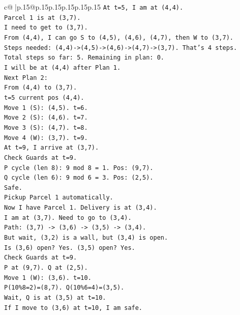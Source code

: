 \documentclass{article}
\begin{document}
{\begin{supertabular}{c@{$\;$}|p{.15\linewidth}@{}p{.15\linewidth}p{.15\linewidth}p{.15\linewidth}p{.15\linewidth}p{.15\linewidth}}
{{{\texttt{At t=5, I am at (4,4).} \\
\texttt{Parcel 1 is at (3,7).} \\
\texttt{I need to get to (3,7).} \\
\texttt{From (4,4), I can go S to (4,5), (4,6), (4,7), then W to (3,7).} \\
\texttt{Steps needed: (4,4){-}>(4,5){-}>(4,6){-}>(4,7){-}>(3,7). That's 4 steps.} \\
\texttt{Total steps so far: 5. Remaining in plan: 0.} \\
\texttt{I will be at (4,4) after Plan 1.} \\
\texttt{Next Plan 2:} \\
\texttt{From (4,4) to (3,7).} \\
\texttt{t=5 current pos (4,4).} \\
\texttt{Move 1 (S): (4,5). t=6.} \\
\texttt{Move 2 (S): (4,6). t=7.} \\
\texttt{Move 3 (S): (4,7). t=8.} \\
\texttt{Move 4 (W): (3,7). t=9.} \\
\texttt{At t=9, I arrive at (3,7).} \\
\texttt{Check Guards at t=9.} \\
\texttt{P cycle (len 8): 9 mod 8 = 1. Pos: (9,7).} \\
\texttt{Q cycle (len 6): 9 mod 6 = 3. Pos: (2,5).} \\
\texttt{Safe.} \\
\texttt{Pickup Parcel 1 automatically.} \\
\texttt{Now I have Parcel 1. Delivery is at (3,4).} \\
\texttt{I am at (3,7). Need to go to (3,4).} \\
\texttt{Path: (3,7) {-}> (3,6) {-}> (3,5) {-}> (3,4).} \\
\texttt{But wait, (3,2) is a wall, but (3,4) is open.} \\
\texttt{Is (3,6) open? Yes. (3,5) open? Yes.} \\
\texttt{Check Guards at t=9.} \\
\texttt{P at (9,7). Q at (2,5).} \\
\texttt{Move 1 (W): (3,6). t=10.} \\
\texttt{P(10\%8=2)=(8,7). Q(10\%6=4)=(3,5).} \\
\texttt{Wait, Q is at (3,5) at t=10.} \\
\texttt{If I move to (3,6) at t=10, I am safe.} \\
}}}
\end{supertabular}}
\end{document}
